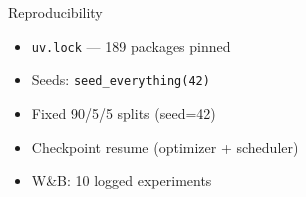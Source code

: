 \documentclass{beamer}
\begin{document}
\begin{frame}[fragile]
\begin{columns}
\begin{block}{Reproducibility}
\footnotesize
\begin{itemize}
  \item \texttt{uv.lock} --- 189 packages pinned
  \item Seeds: \texttt{seed\_everything(42)}
  \item Fixed 90/5/5 splits (seed=42)
  \item Checkpoint resume (optimizer + scheduler)
  \item W\&B: 10 logged experiments
\end{itemize}
\end{block}

\end{columns}

\end{frame}
\end{document}
